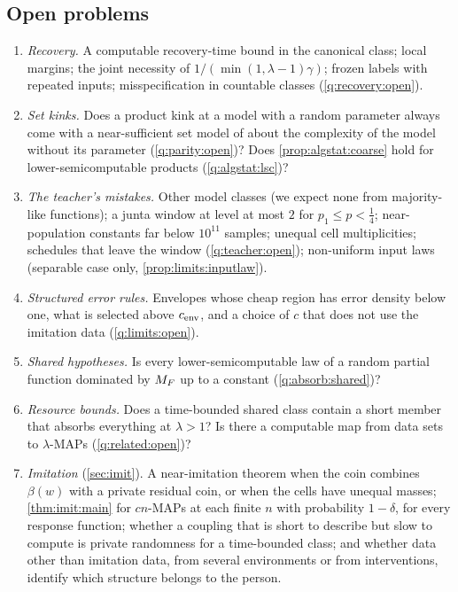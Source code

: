 \subsection{Open problems}\label{sec:discussion:open}

\begin{enumerate}[label=(\arabic*),itemsep=0pt,topsep=2pt]
\item \emph{Recovery.} A computable recovery-time bound in the canonical class; local margins; the joint necessity of $1/(\min(1,\lambda-1)\gamma)$; frozen labels with repeated inputs; misspecification in countable classes (\cref{q:recovery:open}).
\item \emph{Set kinks.} Does a product kink at a model with a random parameter always come with a near-sufficient set model of about the complexity of the model without its parameter (\cref{q:parity:open})? Does \cref{prop:algstat:coarse} hold for lower-semicomputable products (\cref{q:algstat:lsc})?
\item \emph{The teacher's mistakes.} Other model classes (we expect none from majority-like functions); a junta window at level at most $2$ for $p_1\le p<\frac14$; near-population constants far below $10^{11}$ samples; unequal cell multiplicities; schedules that leave the window (\cref{q:teacher:open}); non-uniform input laws (separable case only, \cref{prop:limits:inputlaw}).
\item \emph{Structured error rules.} Envelopes whose cheap region has error density below one, what is selected above $c_{\rm env}$, and a choice of $c$ that does not use the imitation data (\cref{q:limits:open}).
\item \emph{Shared hypotheses.} Is every lower-semicomputable law of a random partial function dominated by $M_{F}$ up to a constant (\cref{q:absorb:shared})?
\item \emph{Resource bounds.} Does a time-bounded shared class contain a short member that absorbs everything at $\lambda>1$? Is there a computable map from data sets to $\lambda$-MAPs (\cref{q:related:open})?
\item \emph{Imitation} (\cref{sec:imit}). A near-imitation theorem when the coin combines $\beta(w)$ with a private residual coin, or when the cells have unequal masses; \cref{thm:imit:main} for $cn$-MAPs at each finite $n$ with probability $1-\delta$, for every response function; whether a coupling that is short to describe but slow to compute is private randomness for a time-bounded class; and whether data other than imitation data, from several environments or from interventions, identify which structure belongs to the person.
\end{enumerate}

